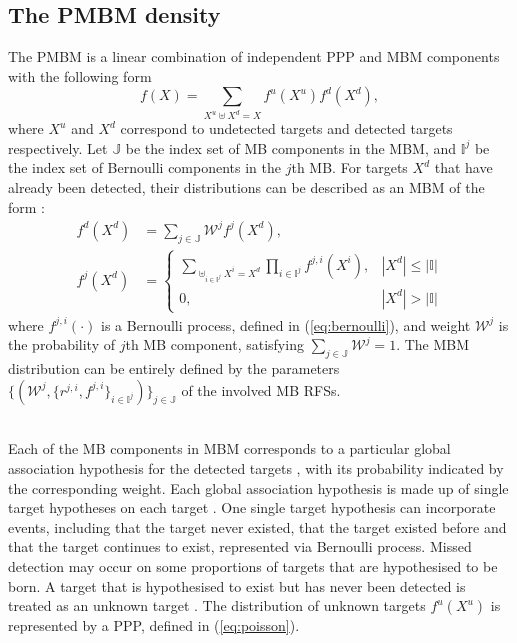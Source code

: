 \subsection{The PMBM density}
The PMBM is a linear combination of independent PPP and MBM components with the following form
\begin{equation}
    f(X) = \sum_{X^u\uplus X^d=X}f^{u}(X^u)f^{d}(X^d),
\label{eq:pmbm}
\end{equation}
where $X^u$ and $X^d$ correspond to undetected targets and detected targets respectively. Let $\mathbb{J}$ be the index set of MB components in the MBM, and $\mathbb{I}^j$ be the index set of Bernoulli components in the $j$th MB. For targets $X^d$ that have already been detected, their distributions can be described as an MBM of the form \cite{pmbmextended2}:
\begin{subequations}
\begin{align}
    f^{d}(X^d) &= \sum_{j\in\mathbb{J}}\mathcal{W}^jf^j(X^d),\\
    f^j(X^d) &= \begin{cases}
\sum_{\uplus_{i\in\mathbb{I}^j}X^i=X^d}\prod_{i\in\mathbb{I}^j}f^{j,i}(X^i), & |X^d| \leq |\mathbb{I}| \\
0, & |X^d| > |\mathbb{I}|
\end{cases}
\end{align}
\label{eq:mbm}
\end{subequations}
where $f^{j,i}(\cdot)$ is a Bernoulli process, defined in (\ref{eq:bernoulli}), and weight $\mathcal{W}^j$ is the probability of $j$th MB component, satisfying $\sum_{j\in\mathbb{J}}\mathcal{W}^j = 1$. The MBM distribution can be entirely defined by the parameters $\{(\mathcal{W}^j,\{r^{j,i},f^{j,i}\}_{i\in\mathbb{I}^j})\}_{j\in\mathbb{J}}$ of the involved MB RFSs. 


~\\
Each of the MB components in MBM corresponds to a particular global association hypothesis for the detected targets \cite{pmbmpoint}, with its probability indicated by the corresponding weight. Each global association hypothesis is made up of single target hypotheses on each target \cite{pmbmpoint}. One single target hypothesis can incorporate events, including that the target never existed, that the target existed before and that the target continues to exist, represented via Bernoulli process. Missed detection may occur on some proportions of targets that are hypothesised to be born. A target that is hypothesised to exist but has never been detected is treated as an unknown target \cite{pmbmpoint}. The distribution of unknown targets $f^u(X^u)$ is represented by a PPP, defined in (\ref{eq:poisson}). 

